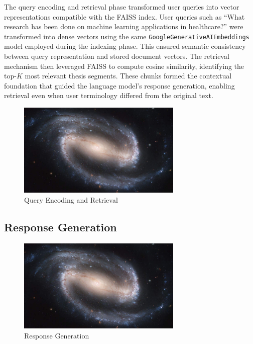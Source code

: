 \begin{refsection}
The query encoding and retrieval phase transformed user queries into vector representations compatible with the FAISS index. User queries such as ``What research has been done on machine learning applications in healthcare?'' were transformed into dense vectors using the same \texttt{GoogleGenerativeAIEmbeddings} model employed during the indexing phase. This ensured semantic consistency between query representation and stored document vectors. The retrieval mechanism then leveraged FAISS to compute cosine similarity, identifying the top-$K$ most relevant thesis segments. These chunks formed the contextual foundation that guided the language model's response generation, enabling retrieval even when user terminology differed from the original text.
\begin{figure}[h]
    \centering
    \includegraphics[width=0.7\textwidth]{figures/sampleFig1.jpg}
    \caption{Query Encoding and Retrieval}
\end{figure}   

\subsection{Response Generation}

\begin{figure}[h]
    \centering
    \includegraphics[width=0.7\textwidth]{figures/sampleFig1.jpg}
    \caption{Response Generation}
\end{figure}


\end{refsection}
